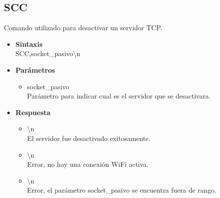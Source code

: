 \documentclass[a4paper,spanish]{article}
\begin{document}
\subsection{SCC}
Comando utilizado para desactivar un servidor TCP. 
\begin{itemize}
	\item \textbf{Sintaxis}\\
	{\ttfamily SCC,socket\_pasivo\textbackslash n}
	\item \textbf{Parámetros}\\
	\begin{itemize}
		\item{\ttfamily socket\_pasivo}\\
		Parámetro para indicar cual es el servidor que se desactivara. 
	\end{itemize}
	\item \textbf{Respuesta}
	\begin{itemize}
		\item{\textbackslash n} \\
		El servidor fue desactivado exitosamente.
		\item{\textbackslash n} \\
		Error, no hay una conexión WiFi activa.
		\item{\textbackslash n} \\
		Error, el parámetro {\ttfamily socket\_pasivo} se encuentra fuera de rango.
	\end{itemize}
\end{itemize}
\end{document}
